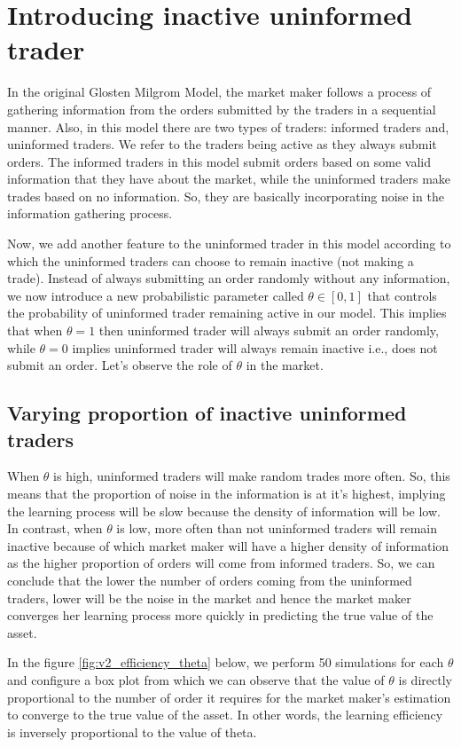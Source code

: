 \documentclass{article}
\begin{document}
\section{Introducing inactive uninformed trader}\label{inactive U}
In the original Glosten Milgrom Model, the market maker follows a process of gathering information from the orders submitted by the traders in a sequential manner. Also, in this model there are two types of traders: informed traders and, uninformed traders. We refer to the traders being active as they always submit orders. The informed traders in this model submit orders based on some valid information that they have about the market, while the uninformed traders make trades based on no information. So, they are basically incorporating noise in the information gathering process.

Now, we add another feature to the uninformed trader in this model according to which the uninformed traders can choose to remain inactive (not making a trade). Instead of always submitting an order randomly without any information, we now introduce a new probabilistic parameter called $\theta \in [0,1]$ that controls the probability of uninformed trader remaining active in our model. This implies that when $\theta = 1$ then uninformed trader will always submit an order randomly, while $\theta = 0$ implies uninformed trader will always remain inactive i.e., does not submit an order. Let's observe the role of $\theta$ in the market.

\subsection{Varying proportion of inactive uninformed traders}
When $\theta$ is high, uninformed traders will make random trades more often. So, this means that the proportion of noise in the information is at it's highest, implying the learning process will be slow because the density of information will be low. In contrast, when $\theta$ is low, more often than not uninformed traders will remain inactive because of which market maker will have a higher density of information as the higher proportion of orders will come from informed traders. So, we can conclude that the lower the number of orders coming from the uninformed traders, lower will be the noise in the market and hence the market maker converges her learning process more quickly in predicting the true value of the asset.

In the figure \ref{fig:v2_efficiency_theta} below, we perform 50 simulations for each $\theta$ and configure a box plot from which we can observe that the value of $\theta$ is directly proportional to the number of order it requires for the market maker's estimation to converge to the true value of the asset. In other words, the learning efficiency is inversely proportional to the value of theta.
\end{document}
